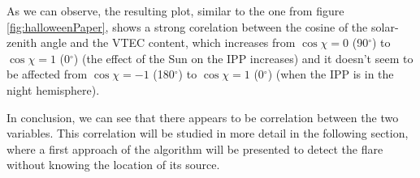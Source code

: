 As we can observe, the resulting plot, similar to the one from figure \ref{fig:halloweenPaper}, shows a strong corelation between the cosine of the solar-zenith angle and the VTEC content, which increases from $\cos\chi = 0$ (90$^{\circ}$) to $\cos\chi = 1$ (0$^{\circ}$) (the effect of the Sun on the IPP increases) and it doesn't seem to be affected from $\cos\chi = -1$ (180$^{\circ}$) to $\cos\chi = 1$ (0$^{\circ}$) (when the IPP is in the night hemisphere).

In conclusion, we can see that there appears to be correlation between the two variables. This correlation will be studied in more detail in the following section, where a first approach of the algorithm will be presented to detect the flare without knowing the location of its source.













